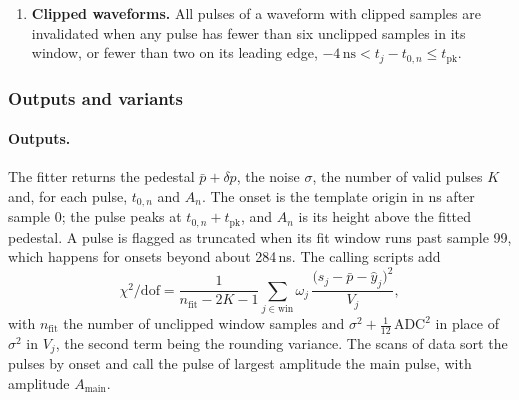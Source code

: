 \documentclass[11pt]{article}
\newcommand{\ns}{\,\mathrm{ns}}
\newcommand{\adc}{\,\mathrm{ADC}}
\newcommand{\code}[1]{\texttt{#1}}
\begin{document}
\begin{enumerate}
\begin{equation}
\Delta\chi^2 = \sum_{j} \omega_j\, \frac{(y_j - \hat y^{\mathrm{old}}_j)^2 - (y_j - \hat y^{\mathrm{new}}_j)^2}{V^{\mathrm{old}}_j} > 2 \ln n_{\mathrm{fit}}
\label{eq:bic}
\end{equation}
(\code{BIC\_PENALTY} $= 1$), where the sum runs over the union of the old and new windows and $n_{\mathrm{fit}}$ is the number of unclipped samples in it. The search continues until a candidate is rejected or the waveform holds six pulses. A waveform without a stage-A pulse also enters, so stage C can supply the first pulse.
\item \textbf{Clipped waveforms.} All pulses of a waveform with clipped samples are invalidated when any pulse has fewer than six unclipped samples in its window, or fewer than two on its leading edge, $-4\ns < t_j - t_{0,n} \le t_{\mathrm{pk}}$.
\end{enumerate}

\subsubsection{Outputs and variants}

\paragraph{Outputs.} The fitter returns the pedestal $\bar p + \delta p$, the noise $\sigma$, the number of valid pulses $K$ and, for each pulse, $t_{0,n}$ and $A_n$. The onset is the template origin in ns after sample 0; the pulse peaks at $t_{0,n} + t_{\mathrm{pk}}$, and $A_n$ is its height above the fitted pedestal. A pulse is flagged as truncated when its fit window runs past sample 99, which happens for onsets beyond about 284\,ns. The calling scripts add
\begin{equation}
\chi^2/\mathrm{dof} = \frac{1}{n_{\mathrm{fit}} - 2K - 1} \sum_{j \in \mathrm{win}} \omega_j\, \frac{\big(s_j - \bar p - \hat y_j\big)^2}{V_j} ,
\label{eq:mfchi2}
\end{equation}
with $n_{\mathrm{fit}}$ the number of unclipped window samples and $\sigma^2 + \tfrac{1}{12}\adc^2$ in place of $\sigma^2$ in $V_j$, the second term being the rounding variance. The scans of data sort the pulses by onset and call the pulse of largest amplitude the main pulse, with amplitude $A_{\mathrm{main}}$.
\end{document}
